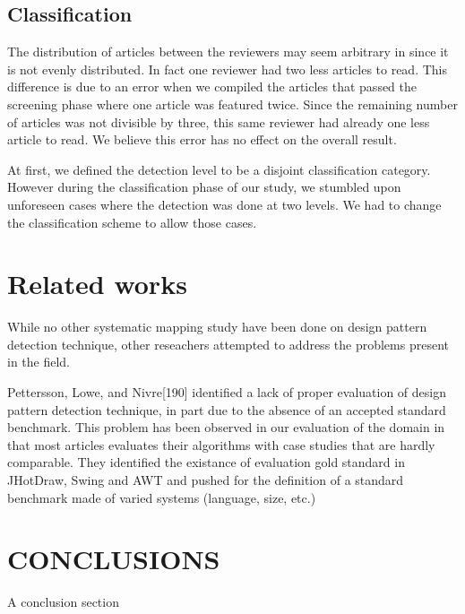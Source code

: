 \documentclass[letterpaper, 10 pt, conference]{ieeeconf}  %
\begin{document}
\subsection{Classification}

The distribution of articles between the reviewers may seem arbitrary in since it is not evenly distributed.
In fact one reviewer had two less articles to read.
This difference is due to an error when we compiled the articles that passed
the screening phase where one article was featured twice.
Since the remaining number of articles was not divisible by three, this same
reviewer had already one less article to read.
We believe this error has no effect on the overall result.

At first, we defined the detection level to be a disjoint classification
category.
However during the classification phase of our study, we stumbled upon
unforeseen cases where the detection was done at two levels.
We had to change the classification scheme to allow those cases.



\section{Related works}

While no other systematic mapping study have been done on design pattern
detection technique, other reseachers attempted to address the problems
present in the field.

Pettersson, Lowe, and Nivre[190] identified a lack of proper evaluation of 
design pattern detection technique, in part due to the absence of an accepted
standard benchmark.
This problem has been observed in our evaluation of the domain in that most
articles evaluates their algorithms with case studies that are hardly
comparable.
They identified the existance of evaluation gold standard in JHotDraw, Swing
and AWT  and pushed for the definition of a standard benchmark made of varied
systems (language, size, etc.)



\section{CONCLUSIONS}

A conclusion section 



\addtolength{\textheight}{-12cm}   

\end{document}
